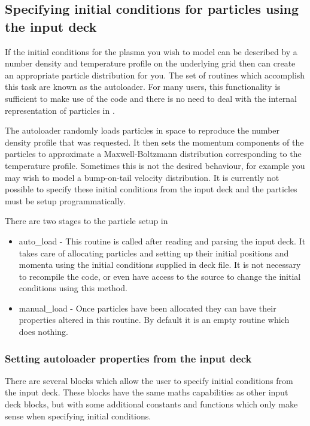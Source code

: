 \subsection{Specifying initial conditions for particles using the input deck}

If the initial conditions for the plasma you wish to model can be described
by a number density and temperature profile on the underlying grid then
{\EPOCH} can create an appropriate particle distribution for you. The
set of routines which accomplish this task are known as the autoloader.
For many users, this functionality is sufficient to make use of the
code and there is no need to deal with the internal representation of
particles in {\EPOCH}.

The autoloader randomly loads particles in space to reproduce the number
density profile that was requested. It then sets the momentum components
of the particles to approximate a Maxwell-Boltzmann distribution
corresponding to the temperature profile. Sometimes this is not the
desired behaviour, for example you may wish to model a bump-on-tail
velocity distribution. It is currently not possible to specify these
initial conditions from the input deck and the particles must be setup
programmatically.

There are two stages to the particle setup in {\EPOCH} 

\begin{itemize}
\item auto\_load - This routine is called after reading and parsing the
  input deck. It takes care of allocating particles and setting up their
  initial positions and momenta using the initial conditions supplied in
  deck file.
  It is not necessary to recompile the code, or even have
  access to the source to change the initial conditions using this method.
\item manual\_load - Once particles have been allocated they can have their
  properties altered in this routine. By default it is an empty routine
  which does nothing.
\end{itemize}

\subsubsection{Setting autoloader properties from the input deck}
There are several blocks which allow the user to specify initial conditions
from the input deck. These blocks have the same maths capabilities as other
input deck blocks, but with some additional constants and functions which
only make sense when specifying initial conditions.\\

